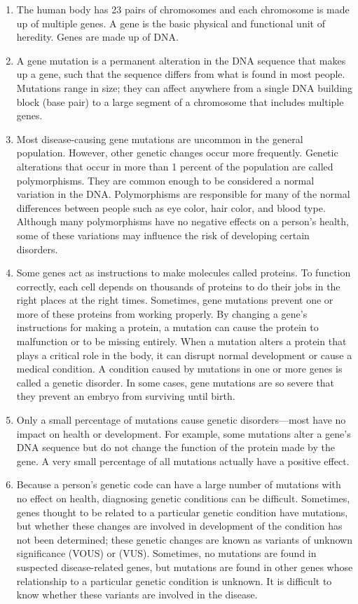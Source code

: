 \documentclass[twoside]{article}
\begin{document}
\begin{enumerate}
\begin{enumerate}
     \item The human body has 23 pairs of chromosomes and each chromosome is made up of multiple genes. A gene is the basic physical and functional unit of heredity. Genes are made up of DNA. 
     \item A gene mutation is a permanent alteration in the DNA sequence that makes up a gene, such that the sequence differs from what is found in most people. Mutations range in size; they can affect anywhere from a single DNA building block (base pair) to a large segment of a chromosome that includes multiple genes.
     \item Most disease-causing gene mutations are uncommon in the general population. However, other genetic changes occur more frequently. Genetic alterations that occur in more than 1 percent of the population are called polymorphisms. They are common enough to be considered a normal variation in the DNA. Polymorphisms are responsible for many of the normal differences between people such as eye color, hair color, and blood type. Although many polymorphisms have no negative effects on a person’s health, some of these variations may influence the risk of developing certain disorders.
     \item Some genes act as instructions to make molecules called proteins. To function correctly, each cell depends on thousands of proteins to do their jobs in the right places at the right times. Sometimes, gene mutations prevent one or more of these proteins from working properly. By changing a gene’s instructions for making a protein, a mutation can cause the protein to malfunction or to be missing entirely. When a mutation alters a protein that plays a critical role in the body, it can disrupt normal development or cause a medical condition. A condition caused by mutations in one or more genes is called a genetic disorder. In some cases, gene mutations are so severe that they prevent an embryo from surviving until birth.
     \item Only a small percentage of mutations cause genetic disorders—most have no impact on health or development. For example, some mutations alter a gene's DNA sequence but do not change the function of the protein made by the gene. A very small percentage of all mutations actually have a positive effect.
     \item Because a person's genetic code can have a large number of mutations with no effect on health, diagnosing genetic conditions can be difficult. Sometimes, genes thought to be related to a particular genetic condition have mutations, but whether these changes are involved in development of the condition has not been determined; these genetic changes are known as variants of unknown significance (VOUS) or (VUS). Sometimes, no mutations are found in suspected disease-related genes, but mutations are found in other genes whose relationship to a particular genetic condition is unknown. It is difficult to know whether these variants are involved in the disease.

\end{enumerate}
\end{enumerate}
\end{document}
